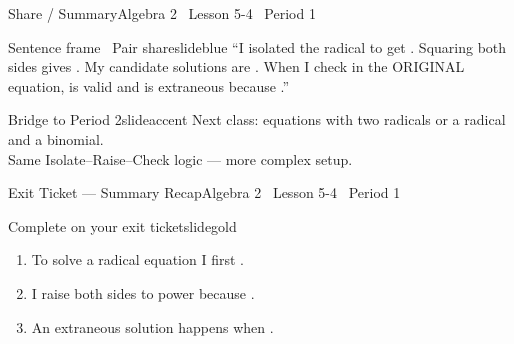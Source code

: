 \documentclass[aspectratio=169, 11pt]{beamer}
\begin{document}
\begin{frame}{Share / Summary}{Algebra 2 \textperiodcentered\ Lesson 5-4 \textperiodcentered\ Period 1}
\vspace{0.2cm}
\begin{projcard}{Sentence frame \textperiodcentered\ Pair share}{slideblue}
``I isolated the radical to get \underline{\hspace{1.5cm}}.
Squaring both sides gives \underline{\hspace{1.5cm}}.
My candidate solutions are \underline{\hspace{1.5cm}}.
When I check in the ORIGINAL equation, \underline{\hspace{1.5cm}} is valid
and \underline{\hspace{1.5cm}} is extraneous because \underline{\hspace{1.5cm}}.''
\end{projcard}

\vspace{0.15cm}
\begin{projcard}{Bridge to Period 2}{slideaccent}
Next class: equations with two radicals or a radical and a binomial.\\
Same Isolate--Raise--Check logic --- more complex setup.
\end{projcard}
\end{frame}

\begin{frame}{Exit Ticket --- Summary Recap}{Algebra 2 \textperiodcentered\ Lesson 5-4 \textperiodcentered\ Period 1}
\vspace{0.2cm}
\begin{projcard}{Complete on your exit ticket}{slidegold}
\begin{enumerate}
  \setlength{\itemsep}{0.2cm}
  \item To solve a radical equation I first \underline{\hspace{5cm}}.
  \item I raise both sides to power \underline{\hspace{2cm}} because \underline{\hspace{3.5cm}}.
  \item An extraneous solution happens when \underline{\hspace{4cm}}.
\end{enumerate}
\end{projcard}
\end{frame}
\end{document}
